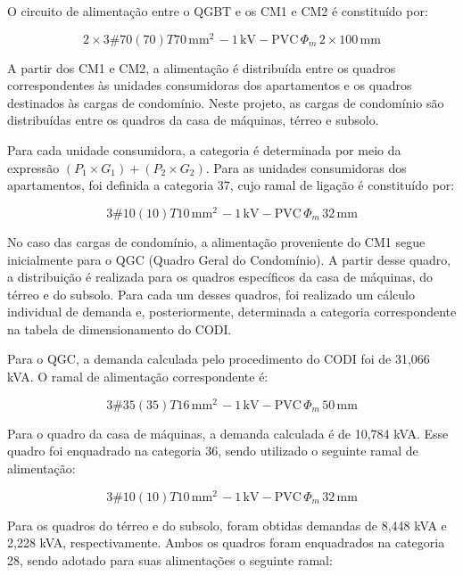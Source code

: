 \documentclass[12pt,openright,oneside,a4paper,brazil]{abntex2}
\begin{document}
O circuito de alimentação entre o QGBT e os CM1 e CM2 é constituído por:

\[2 \times 3\#70(70)T70\,\mathrm{mm}^2\,- 1\,\mathrm{kV} - \mathrm{PVC}\,\Phi_m\,2 \times 100\,\mathrm{mm} \] \vspace{0.01px}

A partir dos CM1 e CM2, a alimentação é distribuída entre os quadros correspondentes às unidades consumidoras dos apartamentos e os quadros destinados às cargas de condomínio. Neste projeto, as cargas de condomínio são distribuídas entre os quadros da casa de máquinas, térreo e subsolo.

Para cada unidade consumidora, a categoria é determinada por meio da expressão \((P_1 \times G_1) + (P_2 \times G_2)\). Para as unidades consumidoras dos apartamentos, foi definida a categoria 37, cujo ramal de ligação é constituído por:

\[3\#10(10)T10\,\mathrm{mm}^2\,- 1\,\mathrm{kV} - \mathrm{PVC}\,\Phi_m\,32\,\mathrm{mm} \] \vspace{0.01px}

No caso das cargas de condomínio, a alimentação proveniente do CM1 segue inicialmente para o QGC (Quadro Geral do Condomínio). A partir desse quadro, a distribuição é realizada para os quadros específicos da casa de máquinas, do térreo e do subsolo. Para cada um desses quadros, foi realizado um cálculo individual de demanda e, posteriormente, determinada a categoria correspondente na tabela de dimensionamento do CODI.

Para o QGC, a demanda calculada pelo procedimento do CODI foi de 31,066 kVA. O ramal de alimentação correspondente é:

\[3\#35(35)T16\,\mathrm{mm}^2\,- 1\,\mathrm{kV} - \mathrm{PVC}\,\Phi_m\,50\,\mathrm{mm} \] \vspace{0.01px}

Para o quadro da casa de máquinas, a demanda calculada é de 10,784 kVA. Esse quadro foi enquadrado na categoria 36, sendo utilizado o seguinte ramal de alimentação:

\[3\#10(10)T10\,\mathrm{mm}^2\,- 1\,\mathrm{kV} - \mathrm{PVC}\,\Phi_m\,32\,\mathrm{mm} \] \vspace{0.01px}

Para os quadros do térreo e do subsolo, foram obtidas demandas de 8,448 kVA e 2,228 kVA, respectivamente. Ambos os quadros foram enquadrados na categoria 28, sendo adotado para suas alimentações o seguinte ramal:
\end{document}
